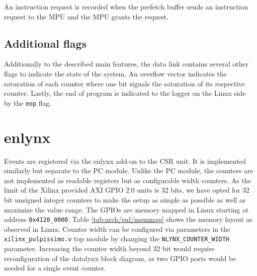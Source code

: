 \documentclass[../bachelor_paper.tex]{subfiles}
\begin{document}
An instruction request is recorded when the prefetch buffer sends an instruction request to the \ac{MPU} and the \ac{MPU} grants the request.

\subsection{Additional flags}
Additionally to the described main features, the data link contains several other flags to indicate the state of the system. An overflow vector indicates the saturation of each counter where one bit signals the saturation of its respective counter. Lastly, the end of program is indicated to the logger on the Linux side by the \texttt{eop} flag.

\section{enlynx}
Events are registered via the enlynx add-on to the \ac{CSR} unit. It is implemented similarly but separate to the \ac{PC} module. Unlike the \ac{PC} module, the counters are not implemented as readable registers but as configurable width counters. As the limit of the Xilinx\textsuperscript{\textregistered} provided AXI GPIO 2.0 units is 32 bits, we have opted for 32 bit unsigned integer counters to make the setup as simple as possible as well as maximize the value range. The GPIOs are memory mapped in Linux starting at address \texttt{0x4120\_0000}. Table \ref{tab:arch/enl/memmap} shows the memory layout as observed in Linux. Counter width can be configured via parameters in the \texttt{xilinx\_pulpissimo.v} top module by changing the \texttt{NLYNX\_COUNTER\_WIDTH} parameter. Increasing the counter width beyond 32 bit would require reconfiguration of the datalynx block diagram, as two GPIO ports would be needed for a single event counter.
\end{document}
